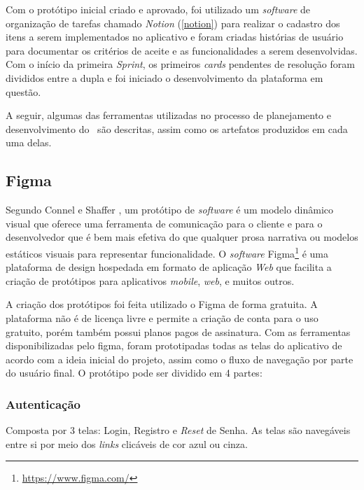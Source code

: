 Com o protótipo inicial criado e aprovado, foi utilizado um \textit{software} de organização de tarefas chamado \textit{Notion} (\ref{notion}) para realizar o cadastro dos itens a serem implementados no aplicativo e foram criadas histórias de usuário para documentar os critérios de aceite e as funcionalidades a serem desenvolvidas. Com o início da primeira \textit{Sprint}, os primeiros \textit{cards} pendentes de resolução foram divididos entre a dupla e foi iniciado o desenvolvimento da plataforma em questão.

A seguir, algumas das ferramentas utilizadas no processo de planejamento e desenvolvimento do \appName\ são descritas, assim como os artefatos produzidos em cada uma delas.

\subsection{Figma}
\label{figma}

Segundo Connel e Shaffer \cite{prototyping}, um protótipo de \textit{software} é um modelo dinâmico visual que oferece uma ferramenta de comunicação para o cliente e para o desenvolvedor que é bem mais efetiva do que qualquer prosa narrativa ou modelos estáticos visuais para representar funcionalidade. O \textit{software} Figma\footnote{\url{https://www.figma.com/}} é uma plataforma de design hospedada em formato de aplicação \textit{Web} que facilita a criação de protótipos para aplicativos \textit{mobile}, \textit{web}, e muitos outros.

A criação dos protótipos foi feita utilizado o Figma de forma gratuita. A plataforma não é de licença livre e permite a criação de conta para o uso gratuito, porém também possui planos pagos de assinatura. Com as ferramentas disponibilizadas pelo figma, foram prototipadas todas as telas do aplicativo de acordo com a ideia inicial do projeto, assim como o fluxo de navegação por parte do usuário final. O protótipo pode ser dividido em 4 partes:

\subsubsection{Autenticação}

Composta por 3 telas: Login, Registro e \textit{Reset} de Senha. As telas são navegáveis entre si por meio dos \textit{links} clicáveis de cor azul ou cinza.


